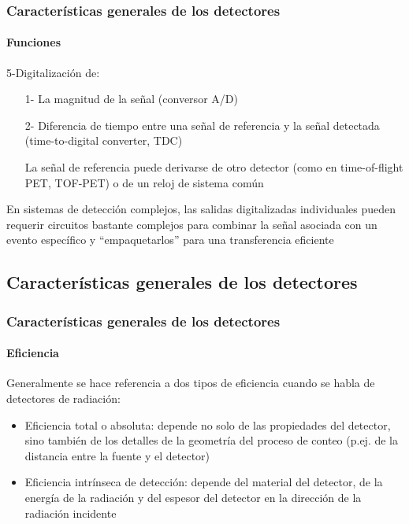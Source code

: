 \documentclass{beamer}
\begin{document}
\begin{frame}
\frametitle{Caracter\'isticas generales de los detectores}
\framesubtitle{{\color{blue}Funciones}}
\begin{block}{5-Digitalizaci\'on de:}
\begin{itemize}
\item[1-] {\color[rgb]{0.5,0,0.13}\small{La magnitud de la señal (conversor
A/D)}}

\item[2-] {\color[rgb]{0.5,0,0.13}\small{Diferencia de tiempo entre una señal de
referencia y la señal detectada (time-to-digital converter, TDC)}}

\small{La señal de referencia puede derivarse de otro detector (como en time-of-flight
PET, TOF-PET) o de un reloj de sistema com\'un}

\end{itemize}
\end{block}

\begin{exampleblock}{}
{\color[rgb]{0.5,0,0.13}\small{En sistemas de detecci\'on complejos, las salidas
digitalizadas individuales pueden requerir circuitos bastante complejos para
combinar la señal asociada con un evento espec\'ifico y ``empaquetarlos'' para una
transferencia eficiente}}
\end{exampleblock}
\end{frame} 

\subsection{Caracter\'isticas generales de los detectores}

\begin{frame}
\frametitle{Caracter\'isticas generales de los detectores}
\framesubtitle{{\color{blue}Eficiencia}}
\begin{exampleblock}{}
Generalmente se hace referencia a dos tipos de eficiencia cuando se habla de
detectores de radiaci\'on:
\begin{itemize}
\item {\color{blue}Eficiencia total o absoluta}: depende no solo de las propiedades del
detector, sino tambi\'en de los detalles de la geometr\'ia del proceso de conteo
(p.ej. de la distancia entre la fuente y el detector)
\item {\color{blue}Eficiencia intr\'inseca de detecci\'on}: depende del material del
detector, de la energ\'ia de la radiaci\'on y del espesor del detector en la
direcci\'on de la radiaci\'on incidente 
\end{itemize}
\end{exampleblock}
\end{frame} 
\end{document}

